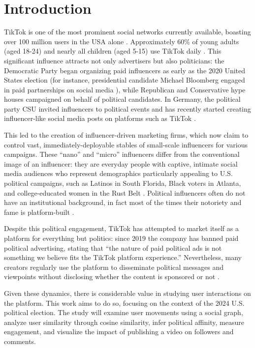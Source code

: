 \section*{Introduction}

TikTok is one of the most prominent social networks currently available, boasting over 100 million users in the USA alone \cite{tktkStat}. Approximately 60\% of young adults (aged 18-24) and nearly all children (aged 5-15) use TikTok daily \cite{https://doi.org/10.1002/poi3.287}. This significant influence attracts not only advertisers but also politicians: the Democratic Party began organizing paid influencers as early as the 2020 United States election (for instance, presidential candidate Michael Bloomberg engaged in paid partnerships on social media \cite{10.3389/fcomm.2021.752656}), while Republican and Conservative hype houses campaigned on behalf of political candidates. In Germany, the political party CSU invited influencers to political events and has recently started creating influencer-like social media posts on platforms such as TikTok \cite{10.3389/fcomm.2021.752656}.

This led to the creation of influencer-driven marketing firms, which now claim to control vast, immediately-deployable stables of small-scale influencers for various campaigns. These “nano” and “micro” influencers differ from the conventional image of an influencer: they are everyday people with captive, intimate social media audiences who represent demographics particularly appealing to U.S. political campaigns, such as Latinos in South Florida, Black voters in Atlanta, and college-educated women in the Rust Belt \cite{theHilltktk}. Political influencers often do not have an institutional background, in fact most of the times their notoriety and fame is platform-built \cite{doi:10.1177/20563051231177938}.

Despite this political engagement, TikTok has attempted to market itself as a platform for everything but politics: since 2019 the company has banned paid political advertising, stating that “the nature of paid political ads is not something we believe fits the TikTok platform experience.” Nevertheless, many creators regularly use the platform to disseminate political messages and viewpoints without disclosing whether the content is sponsored or not \cite{mozilla,politico}.

Given these dynamics, there is considerable value in studying user interactions on the platform. This work aims to do so, focusing on the context of the 2024 U.S. political election. The study will examine user movements using a social graph, analyze user similarity through cosine similarity, infer political affinity, measure engagement, and visualize the impact of publishing a video on followers and comments.